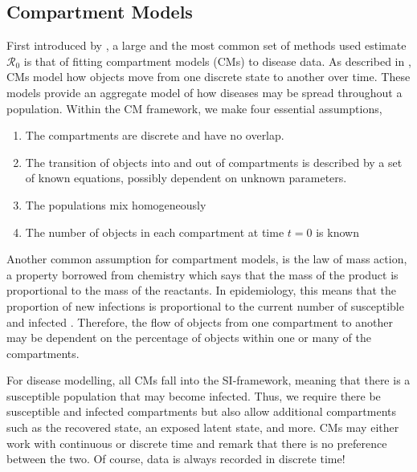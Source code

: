 \documentclass[12pt]{article}
\newcommand{\rr}{\ensuremath{\mathcal{R}_0}}
\begin{document}



\subsection{Compartment Models}
\label{sec:cms}

First introduced by \cite{Kermack700}, a large and the most common set of methods used estimate $\rr$ is that of fitting compartment models (CMs) to disease data.  As described in \cite{daley2001epidemic},  CMs model how objects move from one discrete state to another over time.  These models provide an aggregate model of how diseases may be spread throughout a population.  Within the CM framework, we make four essential assumptions,
\begin{enumerate}
\item The compartments are discrete and have no overlap.
\item The transition of objects into and out of compartments is described by a set of known equations, possibly dependent on unknown parameters.
\item The populations mix homogeneously
  \item The number of objects in each compartment at time $t=0$ is known
  \end{enumerate}  


Another common assumption for compartment models, is the law of mass action, a property borrowed from chemistry which says that the mass of the product is proportional to the mass of the reactants.  In epidemiology, this means that the proportion of new infections is proportional to the current  number of susceptible and infected \citep{anderson1992}.  Therefore, the flow of objects from one compartment to another may be dependent on the percentage of objects within one or many of the compartments. 

For disease modelling, all CMs fall into the SI-framework, meaning that there is a susceptible population that may become infected.  Thus, we require there be susceptible and infected compartments but also allow additional compartments such as the recovered state, an exposed latent state, and more.  CMs may either work with continuous or discrete time and \cite{getz2006} remark that there is no preference between the two.  Of course, data is always recorded in discrete time!
\end{document}
